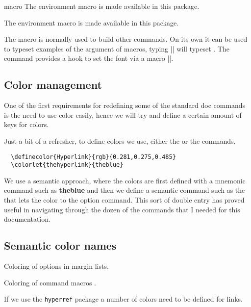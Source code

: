 \begin{environment}{macro} The environment macro is made available in this
package. 
\end{environment}

 The environment macro is made available in this package. 



\begin{macro}{\meta}
The macro  is normally used to build other commands. On its own it can be used to typeset
examples of the argument of macros, typing || will typeset . The command provides a hook to set the font via a macro |\meta@font@select|. 
\end{macro}


\def\meta@font@select{\upshape\color{teal}}


\subsection{Color management}
One of the first requirements for redefining some of the standard doc commands is the need to use color easily, hence we will try and define a certain amount of keys for colors.

Just a bit of a refresher, to define colors we use, either the  or the  commands.

\begin{tcolorbox}
\begin{lstlisting}
  \definecolor{Hyperlink}{rgb}{0.281,0.275,0.485}
  \colorlet{thehyperlink}{theblue}
\end{lstlisting}
\end{tcolorbox}

We use a semantic approach, where the colors are first defined with a mnemonic command such as {\bfseries\textcolor{theblue}{theblue}} and then we define a semantic command such as the that lets the color to the option command. This sort of double entry has proved useful in navigating through the dozen of the commands that I needed for this documentation.


\subsection{Semantic color names}
\begin{marglist}
\item [\option{theoption}] Coloring of options in margin lists.
\item [\option{themacro}] Coloring of command macros .
\item [\option{hyperlink}] If we use the \texttt{hyperref} package a number of colors need to be defined for links.
\end{marglist}

